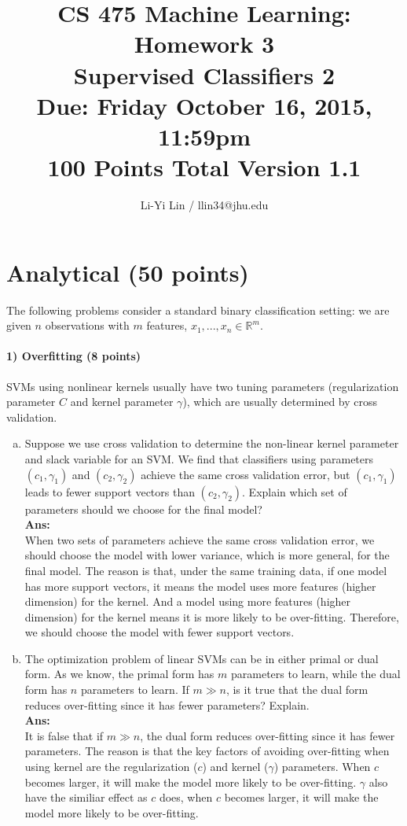 \documentclass[11pt]{article}
\title{CS 475 Machine Learning: Homework 3\\Supervised Classifiers 2\\
\Large{Due: Friday October 16, 2015, 11:59pm}\\
100 Points Total \hspace{1cm} Version 1.1}
\author{Li-Yi Lin / llin34@jhu.edu}
\date{}
\begin{document}
\large
\maketitle
\thispagestyle{headings}




\section{Analytical (50 points)}

The following problems consider a standard binary classification setting: we are given $n$ observations with $m$ features, $x_1,...,x_n \in \mathbb{R}^m$.

\paragraph{1) Overfitting (8 points)}
SVMs using nonlinear kernels usually have two tuning parameters (regularization parameter $C$ and kernel parameter $\gamma$), which are usually determined by cross validation. 
\begin{enumerate}[(a)]
\item Suppose we use cross validation to determine the non-linear kernel parameter and slack variable for an SVM. We find that classifiers using parameters $(c_1,\gamma_1)$ and $(c_2,\gamma_2)$ achieve the same cross validation error, but $(c_1,\gamma_1)$ leads to fewer support vectors than $(c_2,\gamma_2)$. Explain which set of parameters should we choose for the final model?\\
\textbf{Ans:}\\
When two sets of parameters achieve the same cross validation error, we should choose the model with lower variance, which is more general, for the final model. The reason is that, under the same training data, if one model has more support vectors, it means the model uses more features (higher dimension) for the kernel. And a model using more features (higher dimension) for the kernel means it is more likely to be over-fitting. Therefore, we should choose the model with fewer support vectors.

\item The optimization problem of linear SVMs can be in either primal or dual form. As we know, the primal form has $m$ parameters to learn, while the dual form has $n$ parameters to learn. If $m \gg n$, is it true that the dual form reduces over-fitting since it has fewer parameters? Explain.\\
\textbf{Ans:}\\
It is false that if $m \gg n$, the dual form reduces over-fitting since it has fewer parameters. The reason is that the key factors of avoiding over-fitting when using kernel are the regularization ($c$) and kernel ($\gamma$) parameters. When $c$ becomes larger, it will make the model more likely to be over-fitting. $\gamma$ also have the similiar effect as $c$ does, when $c$ becomes larger, it will make the model more likely to be over-fitting.\\
\end{enumerate}
\end{document}
